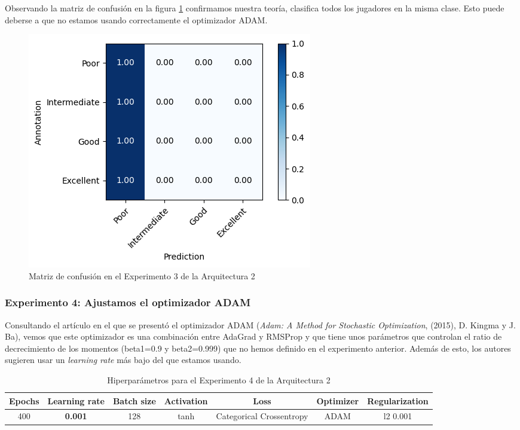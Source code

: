 \documentclass{article}
\begin{document}
			Observando la matriz de confusi\'on en la figura \ref{d-cm-a2-e3} confirmamos nuestra teor\'ia, clasifica todos los jugadores en la misma clase. 
			Esto puede deberse a que no estamos usando correctamente el optimizador ADAM.
			\begin{figure}[!h]
				\begin{center}
					\includegraphics[scale=0.7]{d-cm-a2-e3.png}		
					\caption{Matriz de confusi\'on en el Experimento 3 de la Arquitectura 2}	
					\label{d-cm-a2-e3}
				\end{center}
			\end{figure}
			
			
			
		\subsubsection{Experimento 4: Ajustamos el optimizador ADAM}
		\label{d-s-a2-e4}
			Consultando el art\'iculo en el que se present\'o el optimizador ADAM (\textit{Adam: A Method for Stochastic Optimization}, (2015), D. Kingma y J. Ba), vemos que este optimizador es una combinaci\'on entre AdaGrad y RMSProp y que tiene unos par\'ametros que controlan el ratio de decrecimiento de los momentos (beta1=0.9 y beta2=0.999) que no hemos definido en el experimento anterior. Adem\'as de esto, los autores sugieren usar un \textit{learning rate} m\'as bajo del que estamos usando.
		
			\begin{table}[!h]
				\begin{center}
					\begin{tabular}{| c | c | c | c | c | c | c |}
						\textbf{Epochs} & \textbf{Learning rate} & \textbf{Batch size} & \textbf{Activation} & \textbf{Loss} & \textbf{Optimizer} & \textbf{Regularization} \\ \hline
						400 & \textbf{0.001} & 128 & tanh & Categorical Crossentropy & ADAM & l2 0.001
					\end{tabular}
					\caption{Hiperpar\'ametros para el Experimento 4 de la Arquitectura 2}
					\label{tab:hip-d-a2-e4}
				\end{center}
			\end{table}
			
\end{document}
